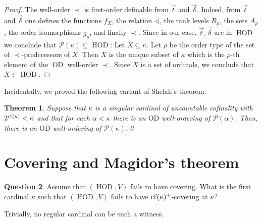 \documentclass[11pt]{amsart}
\newtheorem{theorem}{Theorem}[section]
\theoremstyle{definition}
\newtheorem{question}[theorem]{Question}
\theoremstyle{remark}
\DeclareMathOperator{\HOD}{HOD}
\DeclareMathOperator{\OD}{OD}
\newcommand{\cf}{{\rm cf}}
\def\s{\subseteq}
\begin{document}
\begin{proof}
\smallskip

The well-order $\prec$ is first-order definable from  $\vec{t}$
and $\vec{\delta}$. Indeed, from  $\vec{t}$
and  $\vec{\delta}$ one defines the functions $f_X$, the relation $\lhd$, the rank levels $R_\rho$, the sets $A_\rho$, the order-isomorphisms $g_\rho$, and finally $\prec$. Since in our case, $\vec{t},\vec{\delta}$ are in $\HOD$ we conclude that $\mathcal{P}(\kappa)\s \HOD$: Let $X\s \kappa$.
Let $\rho$ be the order type of the set of $\prec$-predecessors of $X$. Then $X$ is the
unique subset of $\kappa$ which is the $\rho$-th element of the $\OD$ well-order $\prec$. Since $X$ is a set of ordinals, we conclude that $X\in \HOD$. 
 \end{proof}
 Incidentally, we  proved the following variant of Shelah's theorem:
 \begin{theorem}
        Suppose that   $\kappa$ is a singular cardinal  of uncountable cofinality with   $2^{\cf(\kappa)}<\kappa$ and that for each $\alpha < \kappa$ there is an $\mathrm{OD}$ well-ordering of $\mathcal{P}(\alpha)$. Then,   there is an $\mathrm{OD}$ well-ordering of $\mathcal{P}(\kappa)$.\qed
 \end{theorem}

\section{Covering and Magidor's  theorem}\label{sec: optimality of Magidors}

\begin{question}
Assume that $(\HOD, V)$ fails to have covering. 
What is the first cardinal $\kappa$ such that $(\HOD, V)$ fails to have $\cf(\kappa)^+$-covering at $\kappa$?
\end{question}
Trivially, no regular cardinal can be such a witness.
\end{document}
